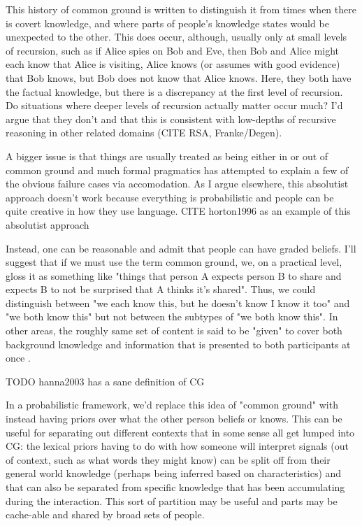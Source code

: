 \documentclass[]{article}
\begin{document}
This history of common ground is written to distinguish it from times when there is covert knowledge, and where parts of people's knowledge states would be unexpected to the other. This does occur, although, usually only at small levels of recursion, such as if Alice spies on Bob and Eve, then Bob and Alice might each know that Alice is visiting, Alice knows (or assumes with good evidence) that Bob knows, but Bob does not know that Alice knows. Here, they both have the factual knowledge, but there is a discrepancy at the first level of recursion. Do situations where deeper levels of recursion actually matter occur much? I'd argue that they don't and that this is consistent with low-depths of recursive reasoning in other related domains (CITE RSA, Franke/Degen). 

A bigger issue is that things are usually treated as being either in or out of common ground and much formal pragmatics has attempted to explain a few of the obvious failure cases via accomodation. As I argue elsewhere, this absolutist approach doesn't work because everything is probabilistic and people can be quite creative in how they use language. CITE horton1996 as an example of this absolutist approach

 Instead, one can be reasonable and admit that people can have graded beliefs. I'll suggest that if we must use the term common ground, we, on a practical level, gloss it as something like "things that person A expects person B to share and expects B to not be surprised that A thinks it's shared". Thus, we could distinguish between "we each know this, but he doesn't know I know it too" and "we both know this" but not between the subtypes of "we both know this". In other areas, the roughly same set of content is said to be "given" to cover both background knowledge and information that is presented to both participants at once \cite{fay2010}. 
 
 TODO hanna2003 has a sane definition of CG
 
 

In a probabilistic framework, we'd replace this idea of "common ground" with instead having priors over what the other person beliefs or knows. This can be useful for separating out different contexts that in some sense all get lumped into CG: the lexical priors having to do with how someone will interpret signals (out of context, such as what words they might know) can be split off from their general world knowledge (perhaps being inferred based on characteristics) and that can also be separated from specific knowledge that has been accumulating during the interaction. This sort of partition may be useful and parts may be cache-able and shared by broad sets of people. 
\end{document}
